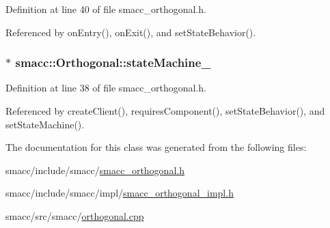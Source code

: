 Definition at line 40 of file smacc\+\_\+orthogonal.\+h.



Referenced by on\+Entry(), on\+Exit(), and set\+State\+Behavior().

\subsubsection[{\texorpdfstring{state\+Machine\+\_\+}{stateMachine_}}]{$\ast$ smacc\+::\+Orthogonal\+::state\+Machine\+\_\+\hspace{0.3cm}{\ttfamily [private]}}\hypertarget{classsmacc_1_1Orthogonal_acea2058ac94667e46fc60ed3d4f524f7}{}\label{classsmacc_1_1Orthogonal_acea2058ac94667e46fc60ed3d4f524f7}


Definition at line 38 of file smacc\+\_\+orthogonal.\+h.



Referenced by create\+Client(), requires\+Component(), set\+State\+Behavior(), and set\+State\+Machine().



The documentation for this class was generated from the following files\+:\begin{DoxyCompactItemize}
\item 
smacc/include/smacc/\hyperlink{smacc__orthogonal_8h}{smacc\+\_\+orthogonal.\+h}\item 
smacc/include/smacc/impl/\hyperlink{smacc__orthogonal__impl_8h}{smacc\+\_\+orthogonal\+\_\+impl.\+h}\item 
smacc/src/smacc/\hyperlink{orthogonal_8cpp}{orthogonal.\+cpp}\end{DoxyCompactItemize}

